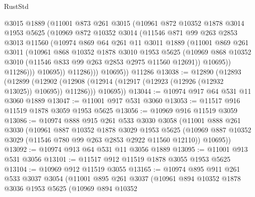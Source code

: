 \begin{lexlean}{RustStd}
\begin{coremodule}
              @3015
              @1889
              (@11001
                @873
                @261
                @3015
                (@10961
                  @872
                  @10352
                  @1878
                  @3014
                  @1953
                  @5625
                  (@10969
                    @872
                    @10352
                    @3014
                    (@11546
                      @871
                      @99
                      @263
                      @2853
                      @3013
                      @11560
                      (@10974
                        @869
                        @64
                        @261
                        @11
                        @3011
                        @1889
                        (@11001
                          @869
                          @261
                          @3011
                          (@10961
                            @868
                            @10352
                            @1878
                            @3010
                            @1953
                            @5625
                            (@10969
                              @868
                              @10352
                              @3010
                              (@11546 @833 @99 @263 @2853 @2975 @11560 @12691))
                            @10695))
                        @11286)))
                  @10695))
              @11286)))
        @10695))
    @11286
@13038 := @12890
    (@12893
      (@12899
        (@12902 (@12908 (@12914 (@12917 (@12923 (@12926 (@12932 @13025)) @10695)) @11286)))
        @10695))
@13044 := @10974 @917 @64 @531 @11 @3060 @1889
@13047 := @11001 @917 @531 @3060
@13053 := @11517 @916 @11519 @1878 @3059 @1953 @5625
@13056 := @10969 @916 @11519 @3059
@13086 := @10974
    @888
    @915
    @261
    @533
    @3030
    @3058
    (@11001
      @888
      @261
      @3030
      (@10961
        @887
        @10352
        @1878
        @3029
        @1953
        @5625
        (@10969 @887 @10352 @3029 (@11546 @780 @99 @263 @2853 @2922 @11560 @12110))
        @10695))
@13092 := @10974 @913 @64 @531 @11 @3056 @1889
@13095 := @11001 @913 @531 @3056
@13101 := @11517 @912 @11519 @1878 @3055 @1953 @5625
@13104 := @10969 @912 @11519 @3055
@13165 := @10974
    @895
    @911
    @261
    @533
    @3037
    @3054
    (@11001
      @895
      @261
      @3037
      (@10961
        @894
        @10352
        @1878
        @3036
        @1953
        @5625
        (@10969
          @894
          @10352

\end{coremodule}
\end{lexlean}
